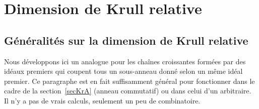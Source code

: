 \section{Dimension de Krull relative} 
\label{secKrullRel}
\subsection{Généralités sur la dimension de Krull relative } 

Nous développons ici un analogue \cof pour les chaînes croissantes 
formées par des idéaux premiers qui coupent tous un sous-anneau donné selon un même idéal premier. Ce paragraphe est en fait suffisamment général 
pour fonctionner dans le cadre de la section~\ref{secKrA} (anneau commutatif) ou dans celui d'un \trdi arbitraire. Il n'y a pas de vrais calculs, seulement un peu de combinatoire.

